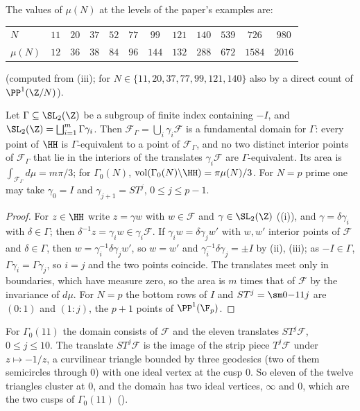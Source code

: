 The values of $\mu(N)$ at the levels of the paper's examples are:
\begin{center}
\begin{tabular}{@{}lccccccccccc@{}}
\toprule
$N$ & $11$ & $20$ & $37$ & $52$ & $77$ & $99$ & $121$ & $140$ & $539$ & $726$ & $980$\\
$\mu(N)$ & $12$ & $36$ & $38$ & $84$ & $96$ & $144$ & $132$ & $288$ & $672$ & $1584$ & $2016$\\
\bottomrule
\end{tabular}
\end{center}
(computed from (iii); for $N\in\{11,20,37,77,99,121,140\}$ also by a direct count of $\PP^1(\Z/N)$).

\begin{proposition}\label{prop:modforms:coset-domains}
Let $\Gamma\subseteq\SL_2(\Z)$ be a subgroup of finite index containing $-I$, and $\SL_2(\Z)=\bigsqcup_{i=1}^m\Gamma\gamma_i$. Then $\mathcal F_\Gamma=\bigcup_i\gamma_i\mathcal F$ is a
fundamental domain for $\Gamma$: every point of $\HH$ is $\Gamma$-equivalent to a point of $\mathcal F_\Gamma$, and no two distinct interior points of $\mathcal F_\Gamma$ that lie in
the interiors of the translates $\gamma_i\mathcal F$ are $\Gamma$-equivalent. Its area is $\int_{\mathcal F_\Gamma}d\mu=m\pi/3$; for $\Gamma_0(N)$, $\operatorname{vol}(\Gamma_0(N)\backslash\HH)=\pi\mu(N)/3$.
For $N=p$ prime one may take $\gamma_0=I$ and $\gamma_{j+1}=ST^j$, $0\le j\le p-1$.
\end{proposition}

\begin{proof}
For $z\in\HH$ write $z=\gamma w$ with $w\in\mathcal F$ and $\gamma\in\SL_2(\Z)$ ((i)), and $\gamma=\delta\gamma_i$ with $\delta\in\Gamma$; then
$\delta^{-1}z=\gamma_iw\in\gamma_i\mathcal F$. If $\gamma_iw=\delta\gamma_jw'$ with $w,w'$ interior points of $\mathcal F$ and $\delta\in\Gamma$, then $w=\gamma_i^{-1}\delta\gamma_jw'$, so $w=w'$
and $\gamma_i^{-1}\delta\gamma_j=\pm I$ by (ii), (iii); as $-I\in\Gamma$, $\Gamma\gamma_i=\Gamma\gamma_j$, so $i=j$ and the two points coincide. The
translates meet only in boundaries, which have measure zero, so the area is $m$ times that of $\mathcal F$ by the invariance of $d\mu$. For $N=p$ the bottom
rows of $I$ and $ST^j=\sm0{-1}1j$ are $(0:1)$ and $(1:j)$, the $p+1$ points of $\PP^1(\F_p)$.
\end{proof}

For $\Gamma_0(11)$ the domain consists of $\mathcal F$ and the eleven translates $ST^j\mathcal F$, $0\le j\le10$. The translate $ST^j\mathcal F$ is the image of the strip piece
$T^j\mathcal F$ under $z\mapsto-1/z$, a curvilinear triangle bounded by three geodesics (two of them semicircles through $0$) with one ideal vertex at the cusp $0$. So eleven of the twelve
triangles cluster at $0$, and the domain has two ideal vertices, $\infty$ and $0$, which are the two cusps of $\Gamma_0(11)$ ().

